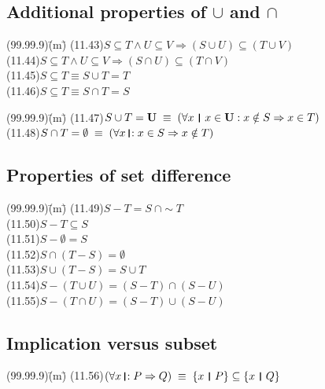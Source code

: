 \documentclass{amsart}
\newcommand{\lgap}{2pt}                             %
\newcommand{\equivs}{\ensuremath{\;\equiv\;}}       %
\newcommand{\impl}{\ensuremath{\Rightarrow}}        %
\newcommand{\thedr}{\rule[-.25ex]{.32mm}{1.75ex}}   %
\newcommand{\dr}{\;\,\thedr\,\;}                    %
\newcommand{\rb}{:}                                 %
\newcommand{\drrb}{\;\thedr\,{:}\;}                 %
\newcommand{\all}{\forall}                          %
\begin{document}
\subsection*{Additional properties of $\cup$ and $\cap$}
\begin{tabbing}
(99.99.9)\;\=(m)\;\=\kill
(11.43)\>$S\subseteq T \land U\subseteq V \impl (S\cup U)\subseteq (T\cup V)$\\[\lgap]
(11.44)\>$S\subseteq T \land U\subseteq V \impl (S\cap U)\subseteq (T\cap V)$\\[\lgap]
(11.45)\>$S\subseteq T \equiv S\cup T = T$\\[\lgap]
(11.46)\>$S\subseteq T \equiv S\cap T = S$\\[\lgap]
\end{tabbing}

\begin{tabbing}
(99.99.9)\;\=(m)\;\=\kill
(11.47)\>$S\cup T = \mathbf{U} \equivs (\all x\dr x\in \mathbf{U}\rb x\notin S\impl x\in T)$\\[\lgap]
(11.48)\>$S\cap T = \emptyset \equivs (\all x\drrb x\in S\impl x\notin T)$\\[\lgap]
\end{tabbing}

\subsection*{Properties of set difference}
\begin{tabbing}
(99.99.9)\;\=(m)\;\=\kill
(11.49)\>$S - T = S\:\cap \sim T$\\[\lgap]
(11.50)\>$S - T \subseteq S$\\[\lgap]
(11.51)\>$S - \emptyset = S$\\[\lgap]
(11.52)\>$S\cap (T - S) = \emptyset$\\[\lgap]
(11.53)\>$S\cup (T - S) = S\cup T$\\[\lgap]
(11.54)\>$S - (T\cup U) = (S - T)\cap (S - U)$\\[\lgap]
(11.55)\>$S - (T\cap U) = (S - T)\cup (S - U)$\\[\lgap]
\end{tabbing}

\subsection*{Implication versus subset}
\begin{tabbing}
(99.99.9)\;\=(m)\;\=\kill
(11.56)\>$(\all x\drrb P\impl Q) \equivs \{x\dr P\} \subseteq \{x\dr Q\}$\\[\lgap]
\end{tabbing}
\end{document}
